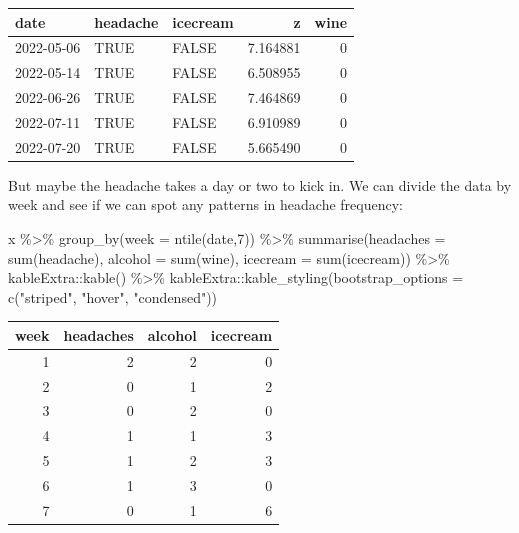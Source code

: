 \documentclass[
]{book}
\newenvironment{Shaded}{\begin{snugshade}}{\end{snugshade}}
\newcommand{\AttributeTok}[1]{\textcolor[rgb]{0.77,0.63,0.00}{#1}}
\newcommand{\DecValTok}[1]{\textcolor[rgb]{0.00,0.00,0.81}{#1}}
\newcommand{\FunctionTok}[1]{\textcolor[rgb]{0.00,0.00,0.00}{#1}}
\newcommand{\NormalTok}[1]{#1}
\newcommand{\SpecialCharTok}[1]{\textcolor[rgb]{0.00,0.00,0.00}{#1}}
\newcommand{\StringTok}[1]{\textcolor[rgb]{0.31,0.60,0.02}{#1}}
\begin{document}
\begin{table}
\centering
\begin{tabular}{l|l|l|r|r}
\hline
date & headache & icecream & z & wine\\
\hline
2022-05-06 & TRUE & FALSE & 7.164881 & 0\\
\hline
2022-05-14 & TRUE & FALSE & 6.508955 & 0\\
\hline
2022-06-26 & TRUE & FALSE & 7.464869 & 0\\
\hline
2022-07-11 & TRUE & FALSE & 6.910989 & 0\\
\hline
2022-07-20 & TRUE & FALSE & 5.665490 & 0\\
\hline
\end{tabular}
\end{table}

But maybe the headache takes a day or two to kick in. We can divide the data by week and see if we can spot any patterns in headache frequency:

\begin{Shaded}
\begin{Highlighting}[]
\NormalTok{x }\SpecialCharTok{\%\textgreater{}\%} \FunctionTok{group\_by}\NormalTok{(}\AttributeTok{week =} \FunctionTok{ntile}\NormalTok{(date,}\DecValTok{7}\NormalTok{)) }\SpecialCharTok{\%\textgreater{}\%} 
  \FunctionTok{summarise}\NormalTok{(}\AttributeTok{headaches =} \FunctionTok{sum}\NormalTok{(headache),}
            \AttributeTok{alcohol =} \FunctionTok{sum}\NormalTok{(wine),}
            \AttributeTok{icecream =} \FunctionTok{sum}\NormalTok{(icecream))  }\SpecialCharTok{\%\textgreater{}\%}\NormalTok{ kableExtra}\SpecialCharTok{::}\FunctionTok{kable}\NormalTok{() }\SpecialCharTok{\%\textgreater{}\%} 
\NormalTok{  kableExtra}\SpecialCharTok{::}\FunctionTok{kable\_styling}\NormalTok{(}\AttributeTok{bootstrap\_options =} \FunctionTok{c}\NormalTok{(}\StringTok{"striped"}\NormalTok{, }\StringTok{"hover"}\NormalTok{, }\StringTok{"condensed"}\NormalTok{))}
\end{Highlighting}
\end{Shaded}

\begin{table}
\centering
\begin{tabular}{r|r|r|r}
\hline
week & headaches & alcohol & icecream\\
\hline
1 & 2 & 2 & 0\\
\hline
2 & 0 & 1 & 2\\
\hline
3 & 0 & 2 & 0\\
\hline
4 & 1 & 1 & 3\\
\hline
5 & 1 & 2 & 3\\
\hline
6 & 1 & 3 & 0\\
\hline
7 & 0 & 1 & 6\\
\hline
\end{tabular}
\end{table}
\end{document}
